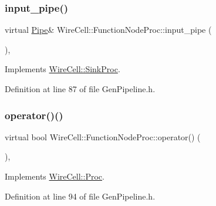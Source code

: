 \subsubsection{\texorpdfstring{input\+\_\+pipe()}{input\_pipe()}}
{\footnotesize\ttfamily virtual \hyperlink{namespace_wire_cell_afce9bb01c731347c3d4c8ca9d4ed804f}{Pipe}\& Wire\+Cell\+::\+Function\+Node\+Proc\+::input\+\_\+pipe (\begin{DoxyParamCaption}{ }\end{DoxyParamCaption})\hspace{0.3cm}{\ttfamily [inline]}, {\ttfamily [virtual]}}



Implements \hyperlink{class_wire_cell_1_1_sink_proc_a47ec8c790457ad63e9d0bb9b1b7da935}{Wire\+Cell\+::\+Sink\+Proc}.



Definition at line 87 of file Gen\+Pipeline.\+h.

\mbox{\label{class_wire_cell_1_1_function_node_proc_a3b6d8a5d564ab458fe52b3c69fd284d1}} 
\subsubsection{\texorpdfstring{operator()()}{operator()()}}
{\footnotesize\ttfamily virtual bool Wire\+Cell\+::\+Function\+Node\+Proc\+::operator() (\begin{DoxyParamCaption}{ }\end{DoxyParamCaption})\hspace{0.3cm}{\ttfamily [inline]}, {\ttfamily [virtual]}}



Implements \hyperlink{class_wire_cell_1_1_proc_a9c642ed1f6b6741633c6cb1bd063b502}{Wire\+Cell\+::\+Proc}.



Definition at line 94 of file Gen\+Pipeline.\+h.

\mbox{\label{class_wire_cell_1_1_function_node_proc_a6aa2af5dd1edf32d89e1841d4484c77e}} 
